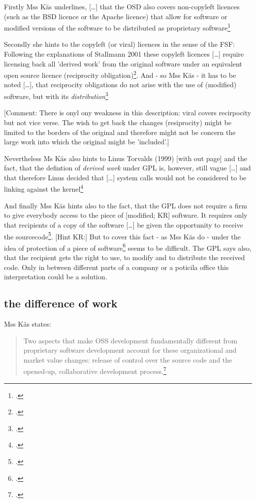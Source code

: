 \documentclass[DIV=calc,BCOR=5mm,11pt,headings=small,oneside,abstract=true, toc=bib]{scrartcl}
\begin{document}
Firstly Mss Käs underlines, \glqq{}[\ldots] that the OSD also covers
non-copyleft licences (such as the BSD licence or the Apache licence) that
allow for software or modified versions of the software to be distributed as
proprietary software\grqq{}\footcite[cf.][63]{Kaes2008a}

Secondly she hints to the \glqq{}copyleft (or viral) licences in the sense of
the FSF\grqq{}: Following the explanations of Stallmann 2001 these copyleft
licences \glqq{}[\ldots] require licensing back all 'derived work' from the
original software under an equivalent open source licence (reciprocity
obligation)\grqq{}\footcite[cf.][63]{Kaes2008a}. And - so Mss Käs -
\glqq{}it has to be noted [\ldots], that reciprocity obligations do not
arise with the use of (modified) software, but with its
\textit{distribution}\grqq{}\footcite[cf.][63 emph.i.o.]{Kaes2008a}

[Comment: There is onyl ony weakness in this description: viral covers
recirpocity but not vice verse. The wish to get back the changes (resiprocity)
might be limited to the borders of the original and therefore might not be
concern the large work into which the original might be 'included'.]

Nevertheless Ms Käs also hints to Linus Torvalds (1999) [with out page] and the
fact, that \glqq{}the defintion of \textit{derived work} under GPL is, however,
still vague [\ldots]\grqq{} and that therefore Linus decided
that \glqq{}[\ldots] system calls would not be considered to be linking against
the kernel\grqq{}\footcite[cf.][63 emph.i.o. last part of the quote
is a requote of Linus statement quoted bei Käs]{Kaes2008a}

And finally Mss Käs hints also to the fact, that \glqq{}the GPL does not
require a firm to give everybody access to the piece of
[modified; KR] software. It requires only that recipients of a copy of
the software [\ldots] be given the opportunity to receive the
sourcecode\grqq{}\footcite[cf.][77]{Kaes2008a}. [Hint KR:] But to cover this
fact - as Mss Käs do - under the idea of \glqq{}protection of a piece of
software\grqq{}\footcite[cf.][77]{Kaes2008a} seems to be difficult. The GPL says
also, that the recipient gets the right to use, to modify and to distribute the
received code. Only in between different parts of a company or a poticila office
this interpretation could be a solution.

\subsection{the difference of work}

Mss Käs states:

\begin{quote} \glqq{}Two aspects that make OSS development fundamentally
different from proprietary software development account for these
organizational and market value changes: release of control over the
source code and the opened-up, collaborative development
process.\grqq{}\footcite[][65]{Kaes2008a}
\end{quote}
\small

\end{document}
